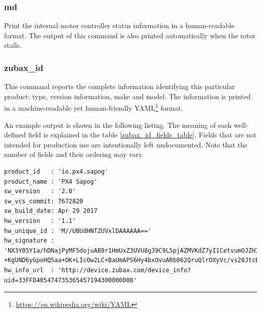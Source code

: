 \documentclass{zubaxdoc}
\begin{document}
\subsubsection{md}

Print the internal motor controller status information in a human-readable format.
The output of this command is also printed automatically when the rotor stalls.

\subsubsection{zubax\_id}\label{sec:cli_zubax_id}

This command reports the complete information identifying this particular product:
type, version information, make and model.
The information is printed in a machine-readable yet human-friendly
YAML\footnote{\url{https://en.wikipedia.org/wiki/YAML}} format.

An example output is shown in the following listing.
The meaning of each well-defined field is explained in the table \ref{zubax_id_fields_table}.
Fields that are not intended for production use are intentionally left undocumented.
Note that the number of fields and their ordering may vary.

\begin{verbatim}
product_id   : 'io.px4.sapog'
product_name : 'PX4 Sapog'
sw_version   : '2.0'
sw_vcs_commit: 7672820
sw_build_date: Apr 29 2017
hw_version   : '1.1'
hw_unique_id : 'M//UBUdHNTZUVxlDAAAAAA=='
hw_signature : 'NX3Y05Y1a/hDNajPyMF5dojuAB9r1HmUxZ3UVU8g39C9L5pjAZMVKdZ7yI1CetvumOJZHIjRYkHOBmMAEKvRU/3mpG\
+KgUND6yGpoHQ5aa+OK+LIcOw2LC+BaUmAPS6Hy4bxOvuARb062QruQlrOXyVc/vs28JtcBzOZo/b/OxY='
hw_info_url  : 'http://device.zubax.com/device_info?uid=33FFD405474735365457194300000000'
\end{verbatim}
\end{document}

